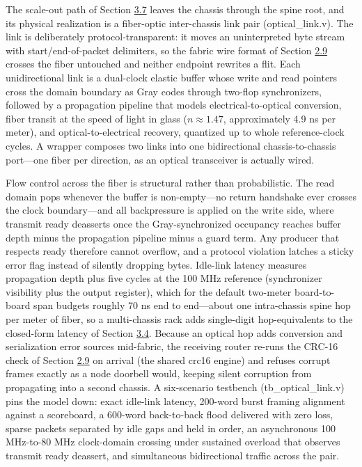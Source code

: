 \documentclass[10pt,twocolumn]{article}
\begin{document}
The scale-out path of Section \hyperref[sec:3.7]{3.7} leaves the chassis through the spine root, and its physical realization is a fiber-optic inter-chassis link pair (optical\_link.v). The link is deliberately protocol-transparent: it moves an uninterpreted byte stream with start/end-of-packet delimiters, so the fabric wire format of Section \hyperref[sec:2.9]{2.9} crosses the fiber untouched and neither endpoint rewrites a flit. Each unidirectional link is a dual-clock elastic buffer whose write and read pointers cross the domain boundary as Gray codes through two-flop synchronizers, followed by a propagation pipeline that models electrical-to-optical conversion, fiber transit at the speed of light in glass ($n \approx 1.47$, approximately 4.9 ns per meter), and optical-to-electrical recovery, quantized up to whole reference-clock cycles. A wrapper composes two links into one bidirectional chassis-to-chassis port---one fiber per direction, as an optical transceiver is actually wired.

Flow control across the fiber is structural rather than probabilistic. The read domain pops whenever the buffer is non-empty---no return handshake ever crosses the clock boundary---and all backpressure is applied on the write side, where transmit ready deasserts once the Gray-synchronized occupancy reaches buffer depth minus the propagation pipeline minus a guard term. Any producer that respects ready therefore cannot overflow, and a protocol violation latches a sticky error flag instead of silently dropping bytes. Idle-link latency measures propagation depth plus five cycles at the 100 MHz reference (synchronizer visibility plus the output register), which for the default two-meter board-to-board span budgets roughly 70 ns end to end---about one intra-chassis spine hop per meter of fiber, so a multi-chassis rack adds single-digit hop-equivalents to the closed-form latency of Section \hyperref[sec:3.4]{3.4}. Because an optical hop adds conversion and serialization error sources mid-fabric, the receiving router re-runs the CRC-16 check of Section \hyperref[sec:2.9]{2.9} on arrival (the shared crc16 engine) and refuses corrupt frames exactly as a node doorbell would, keeping silent corruption from propagating into a second chassis. A six-scenario testbench (tb\_optical\_link.v) pins the model down: exact idle-link latency, 200-word burst framing alignment against a scoreboard, a 600-word back-to-back flood delivered with zero loss, sparse packets separated by idle gaps and held in order, an asynchronous 100 MHz-to-80 MHz clock-domain crossing under sustained overload that observes transmit ready deassert, and simultaneous bidirectional traffic across the pair.
\end{document}
